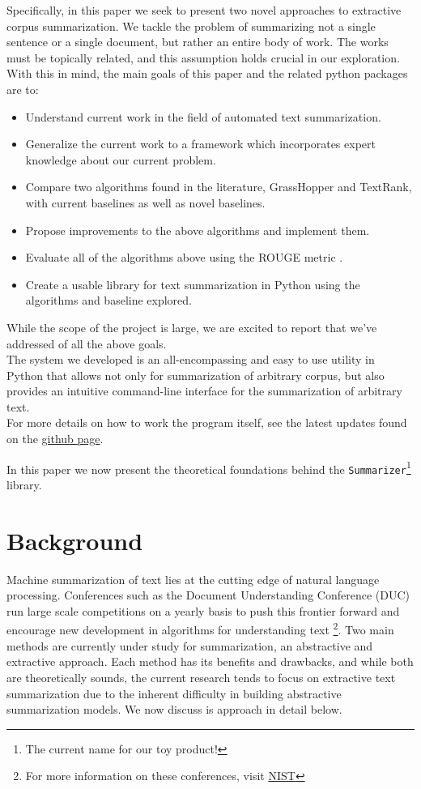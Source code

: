 \documentclass[11pt]{article}
\begin{document}
Specifically, in this paper we seek to present two novel approaches to extractive corpus summarization. We tackle the problem of summarizing not a single sentence or a single document, but rather an entire body of work. The works must be topically related, and this assumption holds crucial in our exploration. With this in mind, the main goals of this paper and the related python packages are to:
\begin{itemize}
\item Understand current work in the field of automated text summarization.
\item Generalize the current work to a framework which incorporates expert knowledge about our current problem.
\item Compare two algorithms found in the literature, GrassHopper and TextRank, with current baselines as well as novel baselines.
\item Propose improvements to the above algorithms and implement them.
\item Evaluate all of the algorithms above using the ROUGE metric \cite{rouge}.
\item Create a usable library for text summarization in Python using the algorithms and baseline explored.
\end{itemize}

While the scope of the project is large, we are excited to report that we've addressed of all the above goals.\\

The system we developed is an all-encompassing and easy to use utility in Python that allows not only for summarization of arbitrary corpus, but also provides an intuitive command-line interface for the summarization of arbitrary text. \\

For more details on how to work the program itself, see the latest updates found on the \href{https://github.com/kandluis/document_summaries}{github page}.

In this paper we now present the theoretical foundations behind the \verb|Summarizer|\footnote{The current name for our toy product!} library.

\section{Background}
Machine summarization of text lies at the cutting edge of natural language processing. Conferences such as the Document Understanding Conference (DUC) run large scale competitions on a yearly basis to push this frontier forward and encourage new development in algorithms for understanding text \footnote{For more information on these conferences, visit \href{http://duc.nist.gov/}{NIST}}. Two main methods are currently under study for summarization, an abstractive and extractive approach. Each method has its benefits and drawbacks, and while both are theoretically sounds, the current research tends to focus on extractive text summarization due to the inherent difficulty in building abstractive summarization models. We now discuss is approach in detail below.
\end{document}
